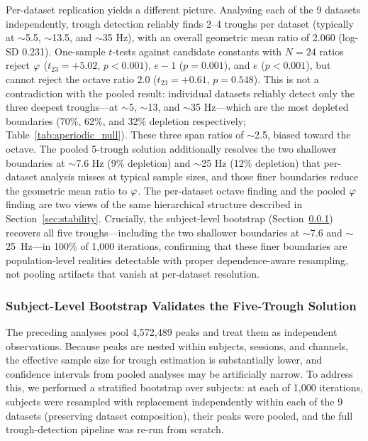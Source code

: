 Per-dataset replication yields a different picture. Analysing each of the 9 datasets independently, trough detection reliably finds 2--4 troughs per dataset (typically at $\sim$5.5, $\sim$13.5, and $\sim$35 Hz), with an overall geometric mean ratio of 2.060 (log-SD 0.231). One-sample $t$-tests against candidate constants with $N = 24$ ratios reject $\varphi$ ($t_{23} = +5.02$, $p < 0.001$), $e - 1$ ($p = 0.001$), and $e$ ($p < 0.001$), but cannot reject the octave ratio 2.0 ($t_{23} = +0.61$, $p = 0.548$). This is not a contradiction with the pooled result: individual datasets reliably detect only the three deepest troughs---at $\sim$5, $\sim$13, and $\sim$35 Hz---which are the most depleted boundaries (70\%, 62\%, and 32\% depletion respectively; Table~\ref{tab:aperiodic_null}). These three span ratios of $\sim$2.5, biased toward the octave. The pooled 5-trough solution additionally resolves the two shallower boundaries at $\sim$7.6 Hz (9\% depletion) and $\sim$25 Hz (12\% depletion) that per-dataset analysis misses at typical sample sizes, and those finer boundaries reduce the geometric mean ratio to $\varphi$. The per-dataset octave finding and the pooled $\varphi$ finding are two views of the same hierarchical structure described in Section~\ref{sec:stability}. Crucially, the subject-level bootstrap (Section~\ref{sec:bootstrap}) recovers all five troughs---including the two shallower boundaries at $\sim$7.6 and $\sim$25~Hz---in 100\% of 1,000 iterations, confirming that these finer boundaries are population-level realities detectable with proper dependence-aware resampling, not pooling artifacts that vanish at per-dataset resolution.

\subsubsection{Subject-Level Bootstrap Validates the Five-Trough Solution}
\label{sec:bootstrap}

The preceding analyses pool 4,572,489 peaks and treat them as independent observations. Because peaks are nested within subjects, sessions, and channels, the effective sample size for trough estimation is substantially lower, and confidence intervals from pooled analyses may be artificially narrow. To address this, we performed a stratified bootstrap over subjects: at each of 1,000 iterations, subjects were resampled with replacement independently within each of the 9 datasets (preserving dataset composition), their peaks were pooled, and the full trough-detection pipeline was re-run from scratch.


